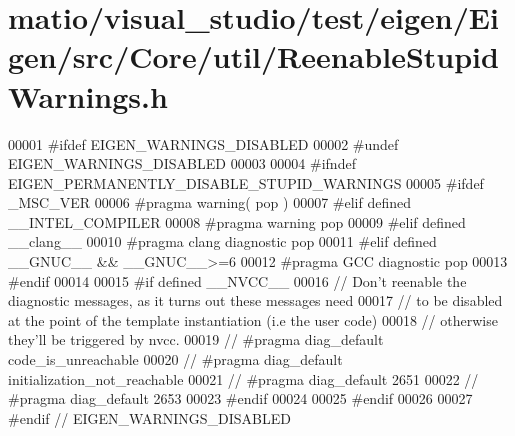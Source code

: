 \hypertarget{matio_2visual__studio_2test_2eigen_2_eigen_2src_2_core_2util_2_reenable_stupid_warnings_8h_source}{}\section{matio/visual\+\_\+studio/test/eigen/\+Eigen/src/\+Core/util/\+Reenable\+Stupid\+Warnings.h}
\label{matio_2visual__studio_2test_2eigen_2_eigen_2src_2_core_2util_2_reenable_stupid_warnings_8h_source}

\begin{DoxyCode}
00001 \textcolor{preprocessor}{#ifdef EIGEN\_WARNINGS\_DISABLED}
00002 \textcolor{preprocessor}{#undef EIGEN\_WARNINGS\_DISABLED}
00003 
00004 \textcolor{preprocessor}{#ifndef EIGEN\_PERMANENTLY\_DISABLE\_STUPID\_WARNINGS}
00005 \textcolor{preprocessor}{  #ifdef \_MSC\_VER}
00006 \textcolor{preprocessor}{    #pragma warning( pop )}
00007 \textcolor{preprocessor}{  #elif defined \_\_INTEL\_COMPILER}
00008 \textcolor{preprocessor}{    #pragma warning pop}
00009 \textcolor{preprocessor}{  #elif defined \_\_clang\_\_}
00010 \textcolor{preprocessor}{    #pragma clang diagnostic pop}
00011 \textcolor{preprocessor}{  #elif defined \_\_GNUC\_\_ && \_\_GNUC\_\_>=6}
00012 \textcolor{preprocessor}{    #pragma GCC diagnostic pop}
00013 \textcolor{preprocessor}{  #endif}
00014 
00015 \textcolor{preprocessor}{  #if defined \_\_NVCC\_\_}
00016 \textcolor{comment}{//    Don't reenable the diagnostic messages, as it turns out these messages need}
00017 \textcolor{comment}{//    to be disabled at the point of the template instantiation (i.e the user code)}
00018 \textcolor{comment}{//    otherwise they'll be triggered by nvcc.}
00019 \textcolor{comment}{//    #pragma diag\_default code\_is\_unreachable}
00020 \textcolor{comment}{//    #pragma diag\_default initialization\_not\_reachable}
00021 \textcolor{comment}{//    #pragma diag\_default 2651}
00022 \textcolor{comment}{//    #pragma diag\_default 2653}
00023 \textcolor{preprocessor}{  #endif}
00024 
00025 \textcolor{preprocessor}{#endif}
00026 
00027 \textcolor{preprocessor}{#endif // EIGEN\_WARNINGS\_DISABLED}
\end{DoxyCode}
